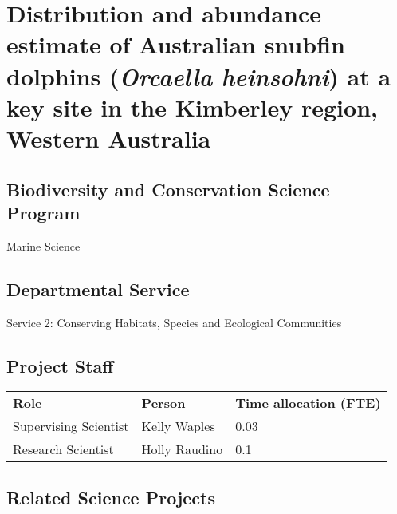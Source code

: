 \documentclass[version=last,
    paper=a4,                               %
    10pt,                                   %
    dvipsnames,
    oneside,                              %
    headings=openany,                       %
    open=any,
    BCOR=7mm,                               %
    DIV=15,     %
]{scrbook}
\begin{document}
\frontmatter
\maketitle
\mainmatter



\section*{Distribution and abundance estimate of Australian snubfin dolphins
(\emph{Orcaella heinsohni}) at a key site in the Kimberley region,
Western Australia
}



\subsection*{Biodiversity and Conservation Science Program}

Marine Science




\subsection*{Departmental Service}

Service 2: Conserving Habitats, Species and Ecological Communities


\subsection*{Project Staff}
\begin{tabu} {X X X}
\textbf{Role} & \textbf{Person} & \textbf{Time allocation (FTE)}\\

Supervising Scientist & Kelly Waples & 0.03\\

Research Scientist & Holly Raudino & 0.1\\

\end{tabu}




\subsection*{Related Science Projects}
\end{document}
